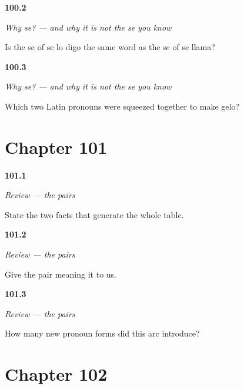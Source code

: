 \noindent\begin{minipage}[t]{\linewidth}
\raggedright
\hypertarget{review-ES-C47-por-que-se-two}{\textbf{100.2}} \emph{Why se? — and why it is not the se you know}\par
\small Is the se of se lo digo the same word as the se of se llama?
\end{minipage}\par\medskip

\noindent\begin{minipage}[t]{\linewidth}
\raggedright
\hypertarget{review-ES-C47-por-que-se-why}{\textbf{100.3}} \emph{Why se? — and why it is not the se you know}\par
\small Which two Latin pronouns were squeezed together to make gelo?
\end{minipage}\par\medskip

\section*{Chapter 101}

\noindent\begin{minipage}[t]{\linewidth}
\raggedright
\hypertarget{review-ES-C47-repaso-dobles-two}{\textbf{101.1}} \emph{Review — the pairs}\par
\small State the two facts that generate the whole table.
\end{minipage}\par\medskip

\noindent\begin{minipage}[t]{\linewidth}
\raggedright
\hypertarget{review-ES-C47-repaso-dobles-us}{\textbf{101.2}} \emph{Review — the pairs}\par
\small Give the pair meaning it to us.
\end{minipage}\par\medskip

\noindent\begin{minipage}[t]{\linewidth}
\raggedright
\hypertarget{review-ES-C47-repaso-dobles-new}{\textbf{101.3}} \emph{Review — the pairs}\par
\small How many new pronoun forms did this arc introduce?
\end{minipage}\par\medskip

\section*{Chapter 102}

